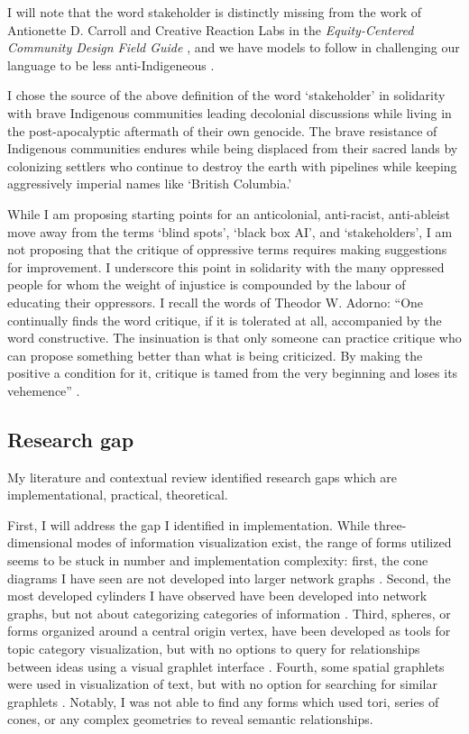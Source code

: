 I will note that the word stakeholder is distinctly missing from the work of Antionette D. Carroll and Creative Reaction Labs in the \textit{Equity-Centered Community Design Field Guide} \citep{creative_reaction_lab_equity-centered_2018}, and we have models to follow in challenging our language to be less anti-Indigeneous \citep{reed_should_2022,phipps_switching_2022,gettel-gilmartin_time_2023-1}. 

I chose the source of the above definition of the word `stakeholder’ in solidarity with brave Indigenous communities leading decolonial discussions while living in the post-apocalyptic aftermath of their own genocide. The brave resistance of Indigenous communities endures while being displaced from their sacred lands by colonizing settlers who continue to destroy the earth with pipelines while keeping aggressively imperial names like `British Columbia.'

While I am proposing starting points for an anticolonial, anti-racist, anti-ableist move away from the terms `blind spots’, `black box AI', and `stakeholders’, I am not proposing that the critique of oppressive terms requires making suggestions for improvement. I underscore this point in solidarity with the many oppressed people for whom the weight of injustice is compounded by the labour of educating their oppressors. I recall the words of Theodor W. Adorno: ``One continually finds the word critique, if it is tolerated at all, accompanied by the word constructive. The insinuation is that only someone can practice critique who can propose something better than what is being criticized. By making the positive a condition for it, critique is tamed from the very beginning and loses its vehemence” \citep[p. 287]{adorno_critical_1998}. 

\subsection{Research gap}
My literature and contextual review identified research gaps which are implementational, practical, theoretical.

First, I will address the gap I identified in implementation. While three-dimensional modes of information visualization exist, the range of forms utilized seems to be stuck in number and implementation complexity: first, the cone diagrams I have seen are not developed into larger network graphs \citep{taylor_creating_1990,bezold_overview_1993,hancock_possible_1994}. Second, the most developed cylinders I have observed have been developed into network graphs, but not about categorizing categories of information \citep{hinderling_50_2017}. Third, spheres, or forms organized around a central origin vertex, have been developed as tools for topic category visualization, but with no options to query for relationships between ideas using a visual graphlet interface \citep{sunter_3d_2023,noauthor_infranodus_2024, weichart_obsidian-3d-graph_2023}. Fourth, some spatial graphlets were used in visualization of text, but with no option for searching for similar graphlets \citep{ortiz_mind_2024}. Notably, I was not able to find any forms which used tori, series of cones, or any complex geometries to reveal semantic relationships. 

